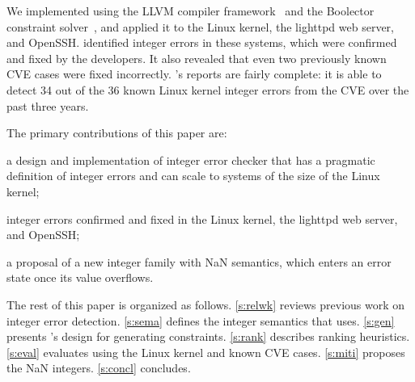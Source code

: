 We implemented \sys using the LLVM compiler framework~\cite{lattner:llvm}
and the Boolector constraint solver~\cite{boolector}, and applied it
to the Linux kernel, the lighttpd web server, and OpenSSH.  \sys
identified \nrbugs integer errors in these systems, which were
confirmed and fixed by the developers.  It also revealed that even
two previously known CVE cases were fixed incorrectly.
\sys's reports are fairly complete: it is able to detect 34 out of the
36 known Linux kernel integer errors from the CVE over the past three
years.

%

The primary contributions of this paper are:
\begin{CompactItemize}
\item a design and implementation of integer error checker that has a pragmatic
  definition of integer errors and can scale to systems of the size of the
  Linux kernel;
\item \nrbugs integer errors confirmed and fixed in
  the Linux kernel, the lighttpd web server, and OpenSSH;
\item a proposal of a new integer family with NaN semantics, which
  enters an error state once its value overflows.
\end{CompactItemize}

The rest of this paper is organized as follows.
\autoref{s:relwk} reviews previous work on integer error detection.
\autoref{s:sema}
defines the integer semantics that \sys uses.  \autoref{s:gen}
presents \sys's design for generating constraints.  \autoref{s:rank}
describes ranking heuristics.  \autoref{s:eval} evaluates \sys using
the Linux kernel and known CVE cases.
\autoref{s:miti} proposes the NaN integers.
\autoref{s:concl} concludes.
